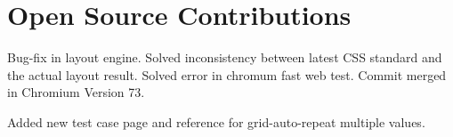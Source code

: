 \section{Open Source Contributions}

{Bug-fix in layout engine. Solved inconsistency between latest CSS standard and the actual layout result. Solved error in chromum fast web test. Commit merged in Chromium Version 73.}

{Added new test case page and reference for grid-auto-repeat multiple values.}

